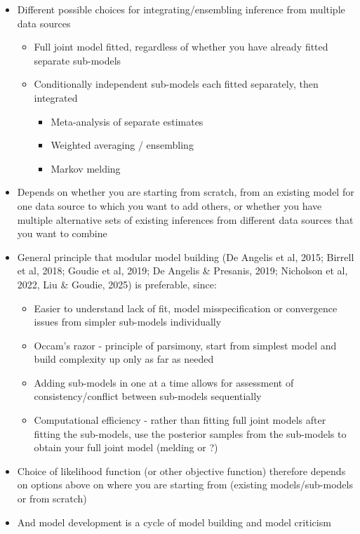 \documentclass{article}
\begin{document}
\begin{itemize}
    \item Different possible choices for integrating/ensembling inference from multiple data sources
    \begin{itemize}
        \item Full joint model fitted, regardless of whether you have already fitted separate sub-models
        \item Conditionally independent sub-models each fitted separately, then integrated
        \begin{itemize}
            \item Meta-analysis of separate estimates
            \item Weighted averaging / ensembling
            \item Markov melding
        \end{itemize}
    \end{itemize}
    \item Depends on whether you are starting from scratch, from an existing model for one data source to which you want to add others, or whether you have multiple alternative sets of existing inferences from different data sources that you want to combine
    \item General principle that modular model building (De Angelis et al, 2015; Birrell et al, 2018; Goudie et al, 2019; De Angelis \& Presanis, 2019; Nicholson et al, 2022, Liu \& Goudie, 2025) is preferable, since:
    \begin{itemize}
        \item Easier to understand lack of fit, model misspecification or convergence issues from simpler sub-models individually
        \item Occam's razor - principle of parsimony, start from simplest model and build complexity up only as far as needed
        \item Adding sub-models in one at a time allows for assessment of consistency/conflict between sub-models sequentially
        \item Computational efficiency - rather than fitting full joint models after fitting the sub-models, use the posterior samples from the sub-models to obtain your full joint model (melding or ?)
    \end{itemize}
    \item Choice of likelihood function (or other objective function) therefore depends on options above on where you are starting from (existing models/sub-models or from scratch)
    \item And model development is a cycle of model building and model criticism
\end{itemize}
\end{document}

